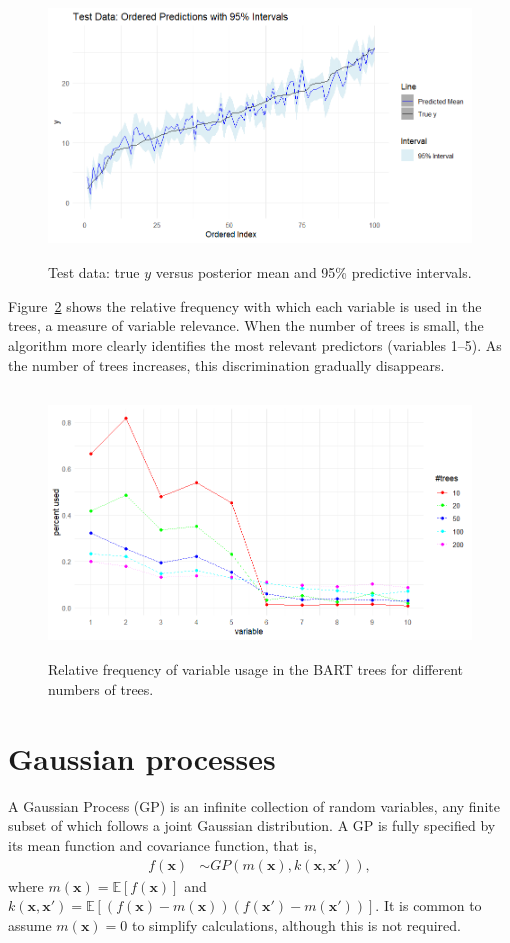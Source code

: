 \begin{figure}[!h]
	\centering
	\includegraphics[width=340pt, height=200pt]{Chapters/chapter13/figures/TestPred.png}
	\caption{Test data: true \(y\) versus posterior mean and 95\% predictive intervals.}
	\label{figTestPred}
\end{figure}

Figure~\ref{figRelvVar} shows the relative frequency with which each variable is used in the trees, a measure of variable relevance. When the number of trees is small, the algorithm more clearly identifies the most relevant predictors (variables 1–5). As the number of trees increases, this discrimination gradually disappears.

\begin{figure}[!h]
	\centering
	\includegraphics[width=340pt, height=200pt]{Chapters/chapter13/figures/RelvVar.png}
	\caption{Relative frequency of variable usage in the BART trees for different numbers of trees.}
	\label{figRelvVar}
\end{figure}

\section{Gaussian processes}\label{13_4}
A Gaussian Process (GP) is an infinite collection of random variables, any finite subset of which follows a joint Gaussian distribution. A GP is fully specified by its mean function and covariance function, that is,
\begin{align*}
	f(\mathbf{x}) &\sim GP(m(\mathbf{x}), k(\mathbf{x}, \mathbf{x}')),
\end{align*}
where \( m(\mathbf{x}) = \mathbb{E}[f(\mathbf{x})] \) and \( k(\mathbf{x}, \mathbf{x}') = \mathbb{E}[(f(\mathbf{x}) - m(\mathbf{x}))(f(\mathbf{x}') - m(\mathbf{x}'))] \).  
It is common to assume \( m(\mathbf{x}) = 0 \) to simplify calculations, although this is not required.

